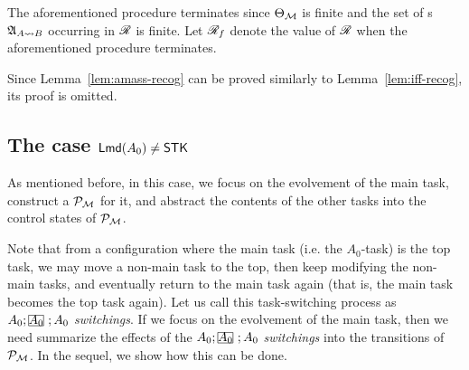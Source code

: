 \medskip

The aforementioned procedure terminates since $\Theta_{\mathcal{M} }$ is finite and the set of {\NFA}s ${\mathfrak{A} }_{A\rightsquigarrow B}$ occurring in $\mathscr{R}$ is finite.
Let $\mathscr{R}_f$ denote the value of $\mathscr{R}$ when the aforementioned procedure terminates. 

Since Lemma~\ref{lem:amass-recog} can be proved similarly to Lemma~\ref{lem:iff-recog}, its proof is omitted. 

\subsection{The case ${\sf Lmd}(A_0) \neq \mathsf{STK}$}\label{sec:amass-nostk}

As mentioned before, in this case, we focus on the evolvement of the main task, construct a {\WOTrPDS} ${\mathcal{P} }_{{\mathcal{M} }}$ for it, and abstract the contents of the other tasks into the control states of ${\mathcal{P} }_{{\mathcal{M} }}$. 

Note that from a configuration where the main task (i.e. the $A_0$-task) is the top task, we may move a non-main task to the top, then keep modifying the non-main tasks, and eventually return to the main task again (that is, the main task becomes the top task again). Let us call this task-switching process as $A_0;\mhcancel{A_0};A_0$ \emph{switchings}. If we focus on the evolvement of the main task, then we need summarize the effects of the $A_0;\mhcancel{A_0};A_0$ \emph{switchings} into the transitions of ${\mathcal{P} }_{{\mathcal{M} }}$.
In the sequel, we show how this can be done. 


